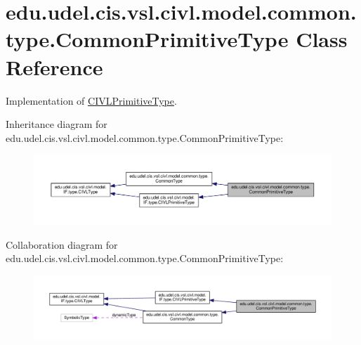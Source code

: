 \hypertarget{classedu_1_1udel_1_1cis_1_1vsl_1_1civl_1_1model_1_1common_1_1type_1_1CommonPrimitiveType}{}\section{edu.\+udel.\+cis.\+vsl.\+civl.\+model.\+common.\+type.\+Common\+Primitive\+Type Class Reference}
\label{classedu_1_1udel_1_1cis_1_1vsl_1_1civl_1_1model_1_1common_1_1type_1_1CommonPrimitiveType}


Implementation of \hyperlink{}{C\+I\+V\+L\+Primitive\+Type}.  




Inheritance diagram for edu.\+udel.\+cis.\+vsl.\+civl.\+model.\+common.\+type.\+Common\+Primitive\+Type\+:
\nopagebreak
\begin{figure}[H]
\begin{center}
\leavevmode
\includegraphics[width=350pt]{classedu_1_1udel_1_1cis_1_1vsl_1_1civl_1_1model_1_1common_1_1type_1_1CommonPrimitiveType__inherit__graph}
\end{center}
\end{figure}


Collaboration diagram for edu.\+udel.\+cis.\+vsl.\+civl.\+model.\+common.\+type.\+Common\+Primitive\+Type\+:
\nopagebreak
\begin{figure}[H]
\begin{center}
\leavevmode
\includegraphics[width=350pt]{classedu_1_1udel_1_1cis_1_1vsl_1_1civl_1_1model_1_1common_1_1type_1_1CommonPrimitiveType__coll__graph}
\end{center}
\end{figure}
